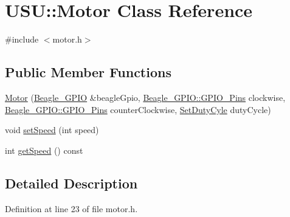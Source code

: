 \hypertarget{class_u_s_u_1_1_motor}{\section{\-U\-S\-U\-:\-:\-Motor \-Class \-Reference}
\label{class_u_s_u_1_1_motor}
}


{\ttfamily \#include $<$motor.\-h$>$}

\subsection*{\-Public \-Member \-Functions}
\begin{DoxyCompactItemize}
\item 
\hyperlink{class_u_s_u_1_1_motor_aefca8e50b8a3a246908a07d8b129a03b}{\-Motor} (\hyperlink{class_beagle___g_p_i_o}{\-Beagle\-\_\-\-G\-P\-I\-O} \&beagle\-Gpio, \hyperlink{class_beagle___g_p_i_o_aa33c6977896ab86e6b493646fcf6c3eb}{\-Beagle\-\_\-\-G\-P\-I\-O\-::\-G\-P\-I\-O\-\_\-\-Pins} clockwise, \hyperlink{class_beagle___g_p_i_o_aa33c6977896ab86e6b493646fcf6c3eb}{\-Beagle\-\_\-\-G\-P\-I\-O\-::\-G\-P\-I\-O\-\_\-\-Pins} counter\-Clockwise, \hyperlink{motor_8h_aa4a2cd53d0866ae4c273573db3c4870d}{\-Set\-Duty\-Cyle} duty\-Cycle)
\item 
void \hyperlink{class_u_s_u_1_1_motor_aa58cbc26a0da87389dd208367d0fa407}{set\-Speed} (int speed)
\item 
int \hyperlink{class_u_s_u_1_1_motor_a98d4c98ddc30e00485712f55b4a91211}{get\-Speed} () const 
\end{DoxyCompactItemize}


\subsection{\-Detailed \-Description}


\-Definition at line 23 of file motor.\-h.



